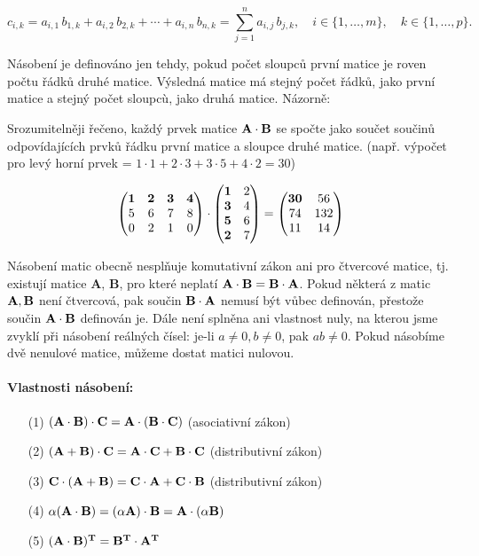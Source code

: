 $$
  c_{i,k} = a_{i,1}\,b_{1,k} + a_{i,2}\,b_{2,k} + \cdots + a_{i,n}\,b_{n,k} 
  = \sum_{j=1}^n a_{i,j}\,b_{j,k}, \quad 
  i\in\{1,\ldots,m\},\quad k\in\{1,\ldots,p\}.
$$

Násobení je definováno jen tehdy, pokud počet sloupců
první matice je roven počtu řádků druhé matice. Výsledná matice má
stejný počet řádků, jako první matice a stejný počet sloupcù, jako
druhá matice. Názorně:

Srozumitelněji řečeno, každý prvek matice $\bf A\cdot\bf B$ se spočte jako součet součinů odpovídajících prvků řádku první matice a sloupce druhé matice. (např. výpočet pro levý horní prvek = $1\cdot1 + 2\cdot3 + 3\cdot5 + 4\cdot2 = 30$)

$$
\begin{pmatrix}
  \bf1 & \bf2 & \bf3 & \bf4 \\
  5 & 6 & 7 & 8 \\
  0 & 2 & 1 & 0
 \end{pmatrix}
\cdot
\begin{pmatrix}
  \bf1 & 2 \\
  \bf3 & 4 \\
  \bf5 & 6 \\
  \bf2 & 7
 \end{pmatrix}
=
\begin{pmatrix}
  \bf30 & 56 \\
  74 & 132 \\
  11 & 14
 \end{pmatrix}
$$

Násobení matic obecně nesplňuje komutativní zákon ani pro čtvercové matice, tj. existují matice \textbf{A}, \textbf{B}, pro které neplatí $\bf A \cdot B = B \cdot A$. Pokud některá z matic $\bf A, B$ není čtvercová, pak součin $\bf B \cdot A$ nemusí být vůbec definován, přestože součin $\bf A \cdot B$ definován je.
Dále není splněna ani vlastnost nuly, na kterou jsme zvyklí při násobení reálných čísel: je-li $a \neq 0, b \neq 0$, pak $ab \neq 0$. Pokud násobíme dvě nenulové matice, můžeme dostat matici nulovou.

\paragraph{Vlastnosti násobení:}

\begin{itemize}[topsep=5pt, itemsep=0pt]
	\item[(1)] $\bf (A \cdot B)  \cdot C = A \cdot (B \cdot C)$ (asociativní zákon)
	\item[(2)] $\bf (A + B)  \cdot C = A \cdot C + B \cdot C$ (distributivní zákon)
	\item[(3)] $\bf C \cdot (A + B) = C \cdot A + C \cdot B$ (distributivní zákon)
	\item[(4)] $\alpha (\bf A \cdot B) = (\alpha A) \cdot B = A \cdot (\alpha B)$
	\item[(5)] $(\bf A \cdot B)^T = B^T \cdot A^T$
\end{itemize}

